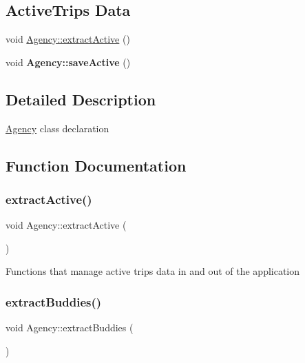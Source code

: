 \subsection*{Active\+Trips Data}
\begin{DoxyCompactItemize}
\item 
void \hyperlink{group___agency_ga82ad0980163a0e874b1ca165b7b9c91c}{Agency\+::extract\+Active} ()
\item 
\mbox{\label{group___agency_ga4ca6cbd58c07be755c1f872e8faa8719}} 
void {\bfseries Agency\+::save\+Active} ()
\end{DoxyCompactItemize}


\subsection{Detailed Description}
\hyperlink{class_agency}{Agency} class declaration 

\subsection{Function Documentation}
\mbox{\label{group___agency_ga82ad0980163a0e874b1ca165b7b9c91c}} 
\subsubsection{\texorpdfstring{extract\+Active()}{extractActive()}}
{\footnotesize\ttfamily void Agency\+::extract\+Active (\begin{DoxyParamCaption}{ }\end{DoxyParamCaption})}

Functions that manage active trips data in and out of the application \mbox{\label{group___agency_ga93c45528d2114a557a1e0b23498e178a}} 
\subsubsection{\texorpdfstring{extract\+Buddies()}{extractBuddies()}}
{\footnotesize\ttfamily void Agency\+::extract\+Buddies (\begin{DoxyParamCaption}{ }\end{DoxyParamCaption})}

